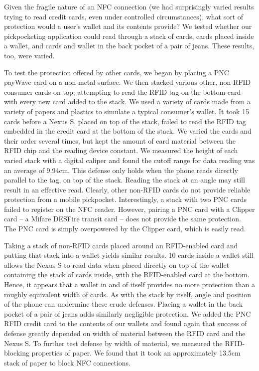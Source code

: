 \documentclass{IEEEtran}
\begin{document}
Given the fragile nature of an NFC connection (we had surprisingly varied results trying to read credit cards, even under controlled circumstances), what sort of protection would a user's wallet and its contents provide?  We tested whether our pickpocketing application could read through a stack of cards, cards placed inside a wallet, and cards and wallet in the back pocket of a pair of jeans.  These results, too, were varied.

To test the protection offered by other cards, we began by placing a PNC payWave card on a non-metal surface.  We then stacked various other, non-RFID consumer cards on top, attempting to read the RFID tag on the bottom card with every new card added to the stack.  We used a variety of cards made from a variety of papers and plastics to simulate a typical consumer's wallet.  It took 15 cards before a Nexus S, placed on top of the stack, failed to read the RFID tag embedded in the credit card at the bottom of the stack.  We varied the cards and their order several times, but kept the amount of card material between the RFID chip and the reading device constant.  We measured the height of each varied stack with a digital caliper and found the cutoff range for data reading was an average of 9.94cm.  This defense only holds when the phone reads directly parallel to the tag, on top of the stack.  Reading the stack at an angle may still result in an effective read.  Clearly, other non-RFID cards do not provide reliable protection from a mobile pickpocket.  Interestingly, a stack with two PNC cards failed to register on the NFC reader.  However, pairing a PNC card with a Clipper card -- a Mifare DESFire transit card -- does not provide the same protection.  The PNC card is simply overpowered by the Clipper card, which is easily read.

Taking a stack of non-RFID cards placed around an RFID-enabled card and putting that stack into a wallet yields similar results.  10 cards inside a wallet still allows the Nexus S to read data when placed directly on top of the wallet containing the stack of cards inside, with the RFID-enabled card at the bottom.  Hence, it appears that a wallet in and of itself provides no more protection than a roughly equivalent width of cards.  As with the stack by itself, angle and position of the phone can undermine these crude defenses. Placing a wallet in the back pocket of a pair of jeans adds similarly negligible protection. We added the PNC RFID credit card to the contents of our wallets and found again that success of defense greatly depended on width of material between the RFID card and the Nexus S.  To further test defense by width of material, we measured the RFID-blocking properties of paper.  We found that it took an approximately 13.5cm stack of paper to block NFC connections.
\end{document}
